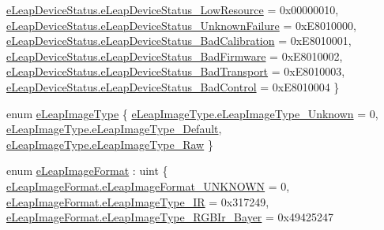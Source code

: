 \begin{DoxyCompactItemize}
\newline
\mbox{\hyperlink{namespace_leap_internal_a16b28ea79f39b6205c514b3e9b075beda0a32bb91b9cec25004341d5c4ccc2229}{e\+Leap\+Device\+Status.\+e\+Leap\+Device\+Status\+\_\+\+Low\+Resource}} = 0x00000010, 
\mbox{\hyperlink{namespace_leap_internal_a16b28ea79f39b6205c514b3e9b075beda6b9c9f722ad7c7be2ace18f6db48646f}{e\+Leap\+Device\+Status.\+e\+Leap\+Device\+Status\+\_\+\+Unknown\+Failure}} = 0x\+E8010000, 
\mbox{\hyperlink{namespace_leap_internal_a16b28ea79f39b6205c514b3e9b075bedab5c1b317eda80462ba0566285e9b3b48}{e\+Leap\+Device\+Status.\+e\+Leap\+Device\+Status\+\_\+\+Bad\+Calibration}} = 0x\+E8010001, 
\mbox{\hyperlink{namespace_leap_internal_a16b28ea79f39b6205c514b3e9b075beda01487252d74832accdefd82a12d42bd4}{e\+Leap\+Device\+Status.\+e\+Leap\+Device\+Status\+\_\+\+Bad\+Firmware}} = 0x\+E8010002, 
\newline
\mbox{\hyperlink{namespace_leap_internal_a16b28ea79f39b6205c514b3e9b075beda4c90e1e00136ac58c933b10551377eb0}{e\+Leap\+Device\+Status.\+e\+Leap\+Device\+Status\+\_\+\+Bad\+Transport}} = 0x\+E8010003, 
\mbox{\hyperlink{namespace_leap_internal_a16b28ea79f39b6205c514b3e9b075bedaf84859cc788ff0abaae566d36e27e05c}{e\+Leap\+Device\+Status.\+e\+Leap\+Device\+Status\+\_\+\+Bad\+Control}} = 0x\+E8010004
 \}
\item 
enum \mbox{\hyperlink{namespace_leap_internal_aa8c735677264cfdbefdd598adb92a1f5}{e\+Leap\+Image\+Type}} \{ \mbox{\hyperlink{namespace_leap_internal_aa8c735677264cfdbefdd598adb92a1f5adf89d541b8f3bf0f0baba467d9b0b5c0}{e\+Leap\+Image\+Type.\+e\+Leap\+Image\+Type\+\_\+\+Unknown}} = 0, 
\mbox{\hyperlink{namespace_leap_internal_aa8c735677264cfdbefdd598adb92a1f5a06a0b262d6848f3f94e8700dfa80706c}{e\+Leap\+Image\+Type.\+e\+Leap\+Image\+Type\+\_\+\+Default}}, 
\mbox{\hyperlink{namespace_leap_internal_aa8c735677264cfdbefdd598adb92a1f5a2c22ff6348f8602db8f795028c5bfbb5}{e\+Leap\+Image\+Type.\+e\+Leap\+Image\+Type\+\_\+\+Raw}}
 \}
\item 
enum \mbox{\hyperlink{namespace_leap_internal_aca2c532ae62549187d1f6e33ee818035}{e\+Leap\+Image\+Format}} \+: uint \{ \mbox{\hyperlink{namespace_leap_internal_aca2c532ae62549187d1f6e33ee818035aa5c2286acbd70d776ed651d210feffe2}{e\+Leap\+Image\+Format.\+e\+Leap\+Image\+Format\+\_\+\+U\+N\+K\+N\+O\+WN}} = 0, 
\mbox{\hyperlink{namespace_leap_internal_aca2c532ae62549187d1f6e33ee818035a03dad16bc365330c2a0d582fe3663297}{e\+Leap\+Image\+Format.\+e\+Leap\+Image\+Type\+\_\+\+IR}} = 0x317249, 
\mbox{\hyperlink{namespace_leap_internal_aca2c532ae62549187d1f6e33ee818035ad4dfa86601739de5042e50c2721445c1}{e\+Leap\+Image\+Format.\+e\+Leap\+Image\+Type\+\_\+\+R\+G\+B\+Ir\+\_\+\+Bayer}} = 0x49425247

\end{DoxyCompactItemize}
